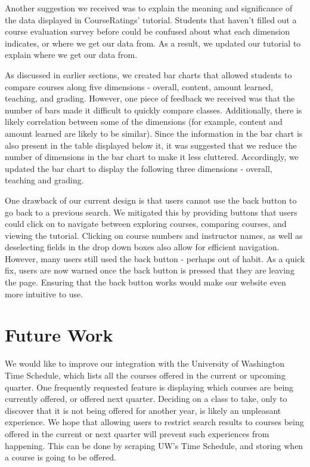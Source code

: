 \documentclass{chi2009}
\begin{document}
Another suggestion we received was to explain the meaning and significance of the data displayed in CourseRatings' tutorial. Students that haven't filled out a course evaluation survey before could be confused about what each dimension indicates, or where we get our data from. As a result, we updated our tutorial to explain where we get our data from.

As discussed in earlier sections, we created bar charts that allowed students to compare courses along five dimensions - overall, content, amount learned, teaching, and grading. However, one piece of feedback we received was that the number of bars made it difficult to quickly compare classes. Additionally, there is likely correlation between some of the dimensions (for example, content and amount learned are likely to be similar). Since the information in the bar chart is also present in the table displayed below it, it was suggested that we reduce the number of dimensions in the bar chart to make it less cluttered. Accordingly, we updated the bar chart to display the following three dimensions - overall, teaching and grading.

One drawback of our current design is that users cannot use the back button to go back to a previous search. We mitigated this by providing buttons that users could click on to navigate between exploring courses, comparing courses, and viewing the tutorial. Clicking on course numbers and instructor names, as well as deselecting fields in the drop down boxes also allow for efficient navigation. However, many users still used the back button - perhaps out of habit. As a quick fix, users are now warned once the back button is pressed that they are leaving the page. Ensuring that the back button works would make our website even more intuitive to use.

\vspace*{-5 pt}
\section{Future Work}
We would like to improve our integration with the University of Washington Time Schedule, which lists all the courses offered in the current or upcoming quarter. One frequently requested feature is displaying which courses are being currently offered, or offered next quarter. Deciding on a class to take, only to discover that it is not being offered for another year, is likely an unpleasant experience. We hope that allowing users to restrict search results to courses being offered in the current or next quarter will prevent such experiences from happening. This can be done by scraping UW’s Time Schedule, and storing when a course is going to be offered.
\end{document}
